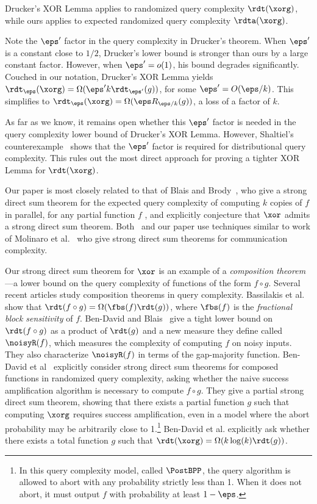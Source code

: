 \documentclass{toc}
\begin{document}
Drucker's XOR Lemma applies to %
%
%
%
randomized  %
query complexity 
$\rdt(\xorg)$, while ours applies to %
expected %
randomized  %
query complexity $\rdta(\xorg)$.

Note the $\eps'$ factor in the query complexity in Drucker's theorem.
When $\eps'$ is a constant close to $1/2$, Drucker's lower bound is
stronger than ours by a large constant factor.  However, when $\eps' = o(1)$,
his bound degrades significantly.  Couched in our notation, Drucker's
XOR Lemma yields
$\rdt_\eps(\xorg) = \Omega(\eps'k \rdt_{\eps'}(g))$, for some
$\eps' = O(\eps/k)$.  This simplifies to
$\rdt_\eps(\xorg) = \Omega(\eps R_{\eps/k}(g))$, a loss of a
factor of $k$.

As far as we know, it remains open whether this $\eps'$ factor is
needed in the query complexity lower bound of Drucker's XOR Lemma.
However, Shaltiel's counterexample~\cite{Shaltiel03} shows that the
$\eps'$ factor is required for distributional query complexity.  This
rules out the most direct approach for proving a tighter XOR Lemma for
$\rdt(\xorg)$.

Our %
paper %
is most closely related to that of Blais and
Brody~\cite{BlaisB19}, who give a strong direct sum theorem for
the expected query complexity of computing $k$ copies of $f$ in parallel, for any partial function $f$%
%
%
%
%
%
, and explicitly
conjecture that $\xor$ admits a strong direct sum theorem.
Both~\cite{BlaisB19} and our %
paper %
use techniques similar to work of
Molinaro et al.~\cite{MolinaroWY13, MolinaroWY15} who give strong
direct sum theorems for communication complexity.

Our strong direct sum theorem for $\xor$ is an example of a \emph{composition
  theorem}---a lower bound on the query complexity of functions of the
form $f\circ g$.  Several %
recent articles study %
composition theorems in query complexity.  Bassilakis et
al.~\cite{BassilakisDGHMT20} show that
$\rdt(f\circ g) = \Omega(\fbs(f)\rdt(g))$, where $\fbs(f)$ is the
\emph{fractional block sensitivity} of $f$.  Ben-David and
Blais~\cite{BenDavidB20a, BenDavidB20b} give a tight lower bound on
$\rdt(f\circ g)$ as a product of $\rdt(g)$ and a new measure they
define called \emph{$\noisyR(f)$}, which measures the complexity of
computing $f$ on noisy inputs.  They also characterize $\noisyR(f)$ in
terms of the gap-majority function.  Ben-David et
al~\cite{BenDavidGKW20} explicitly consider strong direct sum theorems
for composed functions in randomized query complexity, asking whether
the naive success amplification algorithm is necessary to compute
$f\circ g$.  They give a partial strong direct sum theorem, showing
that there exists a partial function $g$ such that computing $\xorg$
requires success amplification, even in a model where the abort
probability may be arbitrarily close to 1.\footnote{In this query
  complexity model, called $\PostBPP$, the query algorithm is allowed
  to abort with any probability strictly less than 1.  When it %
  does not %
  abort, it must output $f$ with probability at least $1-\eps$.}
Ben-David et al. explicitly ask whether there exists a total function
$g$ such that $\rdt(\xorg) = \Omega(k\log(k)\rdt(g))$.
\end{document}

